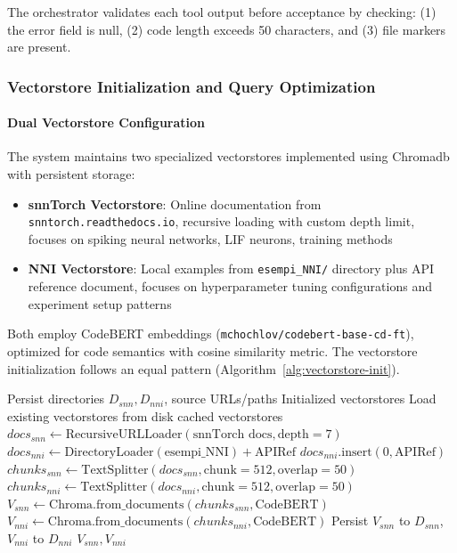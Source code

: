 The orchestrator validates each tool output before acceptance by checking: (1) the error field is null, (2) code length exceeds 50 characters, and (3) file markers are present.

\subsubsection{Vectorstore Initialization and Query Optimization}

\paragraph{Dual Vectorstore Configuration}
The system maintains two specialized vectorstores implemented using Chromadb with persistent storage:

\begin{itemize}
  \item \textbf{snnTorch Vectorstore}: Online documentation from \texttt{snntorch.readthedocs.io}, recursive loading with custom depth limit, focuses on spiking neural networks, LIF neurons, training methods
  \item \textbf{NNI Vectorstore}: Local examples from \texttt{esempi\_NNI/} directory plus API reference document, focuses on hyperparameter tuning configurations and experiment setup patterns
\end{itemize}

Both employ CodeBERT embeddings (\texttt{mchochlov/codebert-base-cd-ft}), optimized for code semantics with cosine similarity metric. The vectorstore initialization follows an equal pattern (Algorithm~\ref{alg:vectorstore-init}).

\begin{algorithm}
\caption{Vectorstore Initialization}
\label{alg:vectorstore-init}
\begin{algorithmic}[1]
\REQUIRE Persist directories \(D_{snn}, D_{nni}\), source URLs/paths
\ENSURE Initialized vectorstores
    \STATE Load existing vectorstores from disk
    \RETURN cached vectorstores
\ENDIF
\STATE \(docs_{snn} \gets \text{RecursiveURLLoader}(\text{snnTorch docs}, \text{depth}=7)\)
\STATE \(docs_{nni} \gets \text{DirectoryLoader}(\text{esempi\_NNI}) + \text{APIRef}\)
\STATE \(docs_{nni}.\text{insert}(0, \text{APIRef})\) 
\STATE \(chunks_{snn} \gets \text{TextSplitter}(docs_{snn}, \text{chunk}=512, \text{overlap}=50)\)
\STATE \(chunks_{nni} \gets \text{TextSplitter}(docs_{nni}, \text{chunk}=512, \text{overlap}=50)\)
\STATE \(V_{snn} \gets \text{Chroma.from\_documents}(chunks_{snn}, \text{CodeBERT})\)
\STATE \(V_{nni} \gets \text{Chroma.from\_documents}(chunks_{nni}, \text{CodeBERT})\)
\STATE Persist \(V_{snn}\) to \(D_{snn}\), \(V_{nni}\) to \(D_{nni}\)
\RETURN \(V_{snn}, V_{nni}\)
\end{algorithmic}
\end{algorithm}

